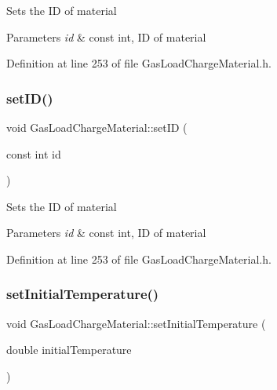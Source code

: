 Sets the ID of material 
\begin{DoxyParams}{Parameters}
{\em id} & const int, ID of material \\
\hline
\end{DoxyParams}


Definition at line 253 of file Gas\+Load\+Charge\+Material.\+h.

\mbox{\label{class_gas_load_charge_material_a12d67d6f764318ab09ca340884e717f9}} 
\subsubsection{\texorpdfstring{set\+I\+D()}{setID()}\hspace{0.1cm}{\footnotesize\ttfamily [3/3]}}
{\footnotesize\ttfamily void Gas\+Load\+Charge\+Material\+::set\+ID (\begin{DoxyParamCaption}\item[{const int}]{id }\end{DoxyParamCaption})\hspace{0.3cm}{\ttfamily [inline]}}

Sets the ID of material 
\begin{DoxyParams}{Parameters}
{\em id} & const int, ID of material \\
\hline
\end{DoxyParams}


Definition at line 253 of file Gas\+Load\+Charge\+Material.\+h.

\mbox{\label{class_gas_load_charge_material_aec9ddfce5e31099b6a047e3d98d80d47}} 
\subsubsection{\texorpdfstring{set\+Initial\+Temperature()}{setInitialTemperature()}\hspace{0.1cm}{\footnotesize\ttfamily [1/3]}}
{\footnotesize\ttfamily void Gas\+Load\+Charge\+Material\+::set\+Initial\+Temperature (\begin{DoxyParamCaption}\item[{double}]{initial\+Temperature }\end{DoxyParamCaption})\hspace{0.3cm}{\ttfamily [inline]}}

